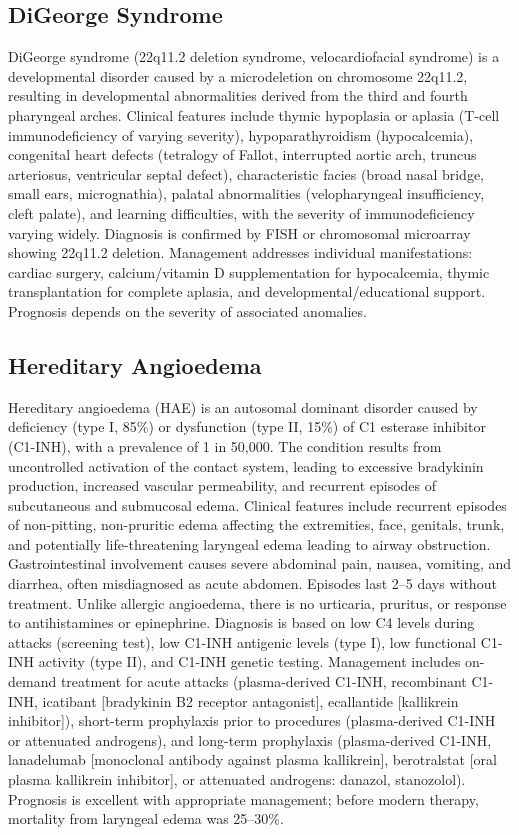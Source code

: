 \subsection{DiGeorge Syndrome}
\label{sec:DiGeorge Syndrome}
DiGeorge syndrome (22q11.2 deletion syndrome, velocardiofacial syndrome) is a developmental disorder caused by a microdeletion on chromosome 22q11.2, resulting in developmental abnormalities derived from the third and fourth pharyngeal arches. Clinical features include thymic hypoplasia or aplasia (T-cell immunodeficiency of varying severity), hypoparathyroidism (hypocalcemia), congenital heart defects (tetralogy of Fallot, interrupted aortic arch, truncus arteriosus, ventricular septal defect), characteristic facies (broad nasal bridge, small ears, micrognathia), palatal abnormalities (velopharyngeal insufficiency, cleft palate), and learning difficulties, with the severity of immunodeficiency varying widely. Diagnosis is confirmed by FISH or chromosomal microarray showing 22q11.2 deletion. Management addresses individual manifestations: cardiac surgery, calcium/vitamin D supplementation for hypocalcemia, thymic transplantation for complete aplasia, and developmental/educational support. Prognosis depends on the severity of associated anomalies.

\subsection{Hereditary Angioedema}
\label{sec:Hereditary Angioedema}
Hereditary angioedema (HAE) is an autosomal dominant disorder caused by deficiency (type I, 85\%) or dysfunction (type II, 15\%) of C1 esterase inhibitor (C1-INH), with a prevalence of 1 in 50,000. The condition results from uncontrolled activation of the contact system, leading to excessive bradykinin production, increased vascular permeability, and recurrent episodes of subcutaneous and submucosal edema. Clinical features include recurrent episodes of non-pitting, non-pruritic edema affecting the extremities, face, genitals, trunk, and potentially life-threatening laryngeal edema leading to airway obstruction. Gastrointestinal involvement causes severe abdominal pain, nausea, vomiting, and diarrhea, often misdiagnosed as acute abdomen. Episodes last 2--5 days without treatment. Unlike allergic angioedema, there is no urticaria, pruritus, or response to antihistamines or epinephrine. Diagnosis is based on low C4 levels during attacks (screening test), low C1-INH antigenic levels (type I), low functional C1-INH activity (type II), and C1-INH genetic testing. Management includes on-demand treatment for acute attacks (plasma-derived C1-INH, recombinant C1-INH, icatibant [bradykinin B2 receptor antagonist], ecallantide [kallikrein inhibitor]), short-term prophylaxis prior to procedures (plasma-derived C1-INH or attenuated androgens), and long-term prophylaxis (plasma-derived C1-INH, lanadelumab [monoclonal antibody against plasma kallikrein], berotralstat [oral plasma kallikrein inhibitor], or attenuated androgens: danazol, stanozolol). Prognosis is excellent with appropriate management; before modern therapy, mortality from laryngeal edema was 25--30\%.

